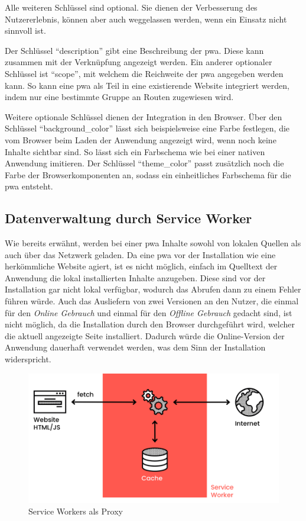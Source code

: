 \documentclass[12pt, parskip=half]{scrartcl}       %
\begin{document}
Alle weiteren Schlüssel sind optional.
Sie dienen der Verbesserung des Nutzererlebnis, können aber auch weggelassen werden, wenn ein Einsatz nicht sinnvoll ist.

Der Schlüssel \enquote{description} gibt eine Beschreibung der \ac{pwa}.
Diese kann zusammen mit der Verknüpfung angezeigt werden.
Ein anderer optionaler Schlüssel ist \enquote{scope}, mit welchem die Reichweite der \ac{pwa} angegeben werden kann.
So kann eine \ac{pwa} als Teil in eine existierende Website integriert werden, indem nur eine bestimmte Gruppe an Routen zugewiesen wird\cite{webdev_addmanifest}.

Weitere optionale Schlüssel dienen der Integration in den Browser.
Über den Schlüssel \enquote{background\_color} lässt sich beispielsweise eine Farbe festlegen, die vom Browser beim Laden der Anwendung angezeigt wird, wenn noch keine Inhalte sichtbar sind.
So lässt sich ein Farbschema wie bei einer nativen Anwendung imitieren.
Der Schlüssel \enquote{theme\_color} passt zusätzlich noch die Farbe der Browserkomponenten an, sodass ein einheitliches Farbschema für die \ac{pwa} entsteht.



\subsection{Datenverwaltung durch Service Worker}

Wie bereits erwähnt, werden bei einer \ac{pwa} Inhalte sowohl von lokalen Quellen als auch über das Netzwerk geladen.
Da eine \ac{pwa} vor der Installation wie eine herkömmliche Website agiert, ist es nicht möglich, einfach im Quelltext der Anwendung die lokal installierten Inhalte anzugeben.
Diese sind vor der Installation gar nicht lokal verfügbar, wodurch das Abrufen dann zu einem Fehler führen würde.
Auch das Ausliefern von zwei Versionen an den Nutzer, die einmal für den \textit{Online Gebrauch} und einmal für den \textit{Offline Gebrauch} gedacht sind, ist nicht möglich, da die Installation durch den Browser durchgeführt wird, welcher die aktuell angezeigte Seite installiert.
Dadurch würde die Online-Version der Anwendung dauerhaft verwendet werden, was dem Sinn der Installation widerspricht.

\begin{figure}
  \centering
  \includegraphics[width=1\linewidth]{src/ServiceWorker-Heise.png}
  \caption{Service Workers als Proxy\cite{src_serviceworker_heise}}
  \label{fig:heise_serviceworker}
\end{figure}
\end{document}
